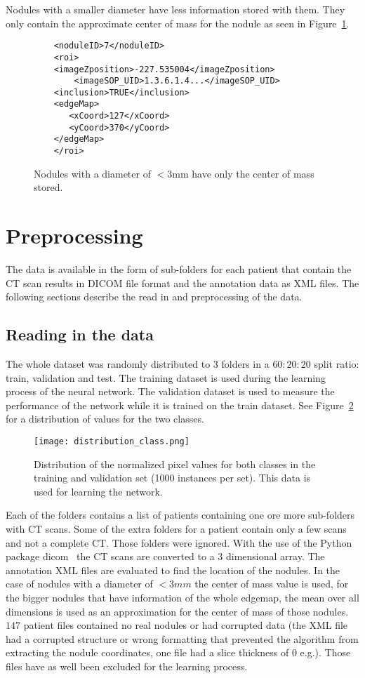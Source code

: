 \documentclass[../Thesis.tex]{subfiles}
\begin{document}
Nodules with a smaller diameter have less information stored with them. They only contain the approximate center of mass for the nodule as seen in Figure~\ref{fig:smallNod}.

\begin{figure}
\begin{lstlisting}
	<noduleID>7</noduleID>
	<roi>
	<imageZposition>-227.535004</imageZposition>
        <imageSOP_UID>1.3.6.1.4...</imageSOP_UID>
	<inclusion>TRUE</inclusion>
	<edgeMap>
	   <xCoord>127</xCoord>
	   <yCoord>370</yCoord>
	</edgeMap>
	</roi>
\end{lstlisting}
\caption{Nodules with a diameter of $<3$mm have only the center of mass stored.}
\label{fig:smallNod}
\end{figure}

\section{Preprocessing}
The data is available in the form of sub-folders for each patient that contain the CT scan results in DICOM file format and the annotation data as XML files. The following sections describe the read in and preprocessing of the data.

\subsection{Reading in the data}
The whole dataset was randomly distributed to 3 folders in a $60:20:20$ split ratio: train, validation and test. The training dataset is used during the learning process of the neural network. The validation dataset is used to measure the performance of the network while it is trained on the train dataset. See Figure~\ref{fig:ttdist} for a distribution of values for the two classes.
 
\begin{figure}
\texttt{[image: distribution\_class.png]}
\caption{Distribution of the normalized pixel values for both classes in the training and validation set (1000 instances per set). This data is used for learning the network.}
\label{fig:ttdist}
\end{figure}

Each of the folders contains a list of patients containing one ore more sub-folders with CT scans. Some of the extra folders for a patient contain only a few scans and not a complete CT. Those folders were ignored. With the use of the Python package dicom~\cite{mason2011t} the CT scans are converted to a 3 dimensional array. The annotation XML files are evaluated to find the location of the nodules. In the case of nodules with a diameter of $<3mm$ the center of mass value is used, for the bigger nodules that have information of the whole edgemap, the mean over all dimensions is used as an approximation for the center of mass of those nodules. 
$147$ patient files contained no real nodules or had corrupted data (the XML file had a corrupted structure or wrong formatting that prevented the algorithm from extracting the nodule coordinates, one file had a slice thickness of $0$ e.g.). Those files have as well been excluded for the learning process.
\end{document}
